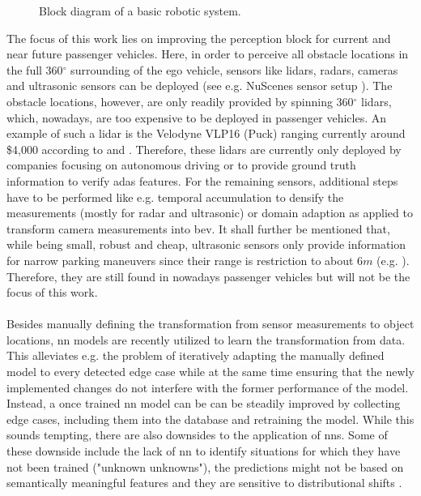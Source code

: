 %
\begin{figure}[H]
	\begin{center}
		\caption{\label{fig:basic_robot_system}Block diagram of a basic robotic system.}
	\end{center}
\end{figure} 
%
The focus of this work lies on improving the perception block for current and near future passenger vehicles. Here, in order to perceive all obstacle locations in the full 360$^{\circ}$ surrounding of the ego vehicle, sensors like lidars, radars, cameras and ultrasonic sensors can be deployed (see e.g. NuScenes sensor setup \cite{caesar2020nuscenes}). The obstacle locations, however, are only readily provided by spinning 360$^{\circ}$ lidars, which, nowadays, are too expensive to be deployed in passenger vehicles. An example of such a lidar is the Velodyne VLP16 (Puck) ranging currently around \$4,000 according to \cite{cnet2018} and \cite{velodyne2018}. Therefore, these lidars are currently only deployed by companies focusing on autonomous driving or to provide ground truth information to verify \gls{adas} features. For the remaining sensors, additional steps have to be performed like e.g. temporal accumulation to densify the measurements (mostly for radar and ultrasonic) or domain adaption as applied to transform camera measurements into \gls{bev}. It shall further be mentioned that, while being small, robust and cheap, ultrasonic sensors only provide information for narrow parking maneuvers since their range is restriction to about 6$m$ (e.g. \cite{boschultrasonic2022}). Therefore, they are still found in nowadays passenger vehicles but will not be the focus of this work.
\\\\
Besides manually defining the transformation from sensor measurements to object locations, \gls{nn} models are recently utilized to learn the transformation from data. This alleviates e.g. the problem of iteratively adapting the manually defined model to every detected edge case while at the same time ensuring that the newly implemented changes do not interfere with the former performance of the model. Instead, a once trained \gls{nn} model can be can be steadily improved by collecting edge cases, including them into the database and retraining the model. While this sounds tempting, there are also downsides to the application of \gls{nn}s. Some of these downside include the lack of \gls{nn} to identify situations for which they have not been trained ("unknown unknowns"), the predictions might not be based on semantically meaningful features and they are sensitive to distributional shifts \cite{safetyfirst2019}.
